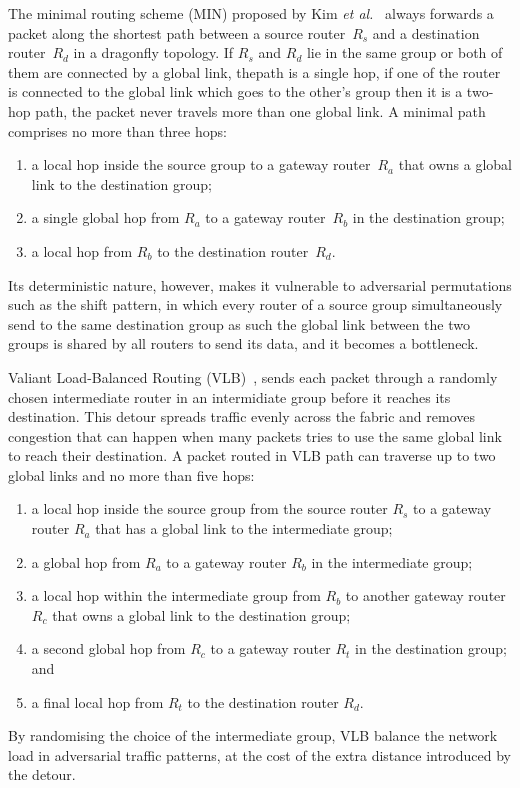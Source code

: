The minimal routing scheme (MIN) proposed by Kim \emph{et al.}~\cite{kim2008technology}
always forwards a packet along the shortest path between a source router~$R_s$ and a destination
router~$R_d$ in a dragonfly topology. If $R_s$ and $R_d$ lie in the same group or both of them are connected by a global link, thepath is a single hop, if one of the router is connected to the global link which goes to the other's group then it is a two-hop path, the packet never travels more than one global link. 
A minimal path comprises no more than three hops:

\begin{enumerate}
  \item a local hop inside the source group to a gateway router~$R_a$ that owns a global
        link to the destination group;
  \item a single global hop from $R_a$ to a gateway router~$R_b$ in the destination group;
  \item a local hop from $R_b$ to the destination router~$R_d$.
\end{enumerate}

Its deterministic nature, however, makes it vulnerable to adversarial permutations such
as the shift pattern, in which every router of a source group simultaneously send to the same
destination group as such the global link between the two groups is shared by all routers
to send its data, and it becomes a bottleneck.


Valiant Load-Balanced Routing (VLB)~\cite{kim2008technology, kaplan2017unveiling}, sends each packet through a randomly chosen intermediate router in an intermidiate group before it reaches its destination. This detour spreads traffic evenly across the
fabric and removes congestion that can happen when many packets tries to use the same global link to reach their destination. A packet routed in VLB path can traverse up to two global links and no more than five hops:
\begin{enumerate}
  \item a local hop inside the source group from the source router \(R_s\) to a
        gateway router \(R_a\) that has a global link to the intermediate group;
  \item a global hop from \(R_a\) to a gateway router \(R_b\) in the
        intermediate group;
  \item a local hop within the intermediate group from \(R_b\) to another
        gateway router \(R_c\) that owns a global link to the destination group;
  \item a second global hop from \(R_c\) to a gateway router \(R_t\) in the
        destination group; and
  \item a final local hop from \(R_t\) to the destination router \(R_d\).
\end{enumerate}
By randomising the choice of the intermediate group, VLB balance the network load in adversarial
traffic patterns, at the cost of the extra distance introduced by the detour. 

